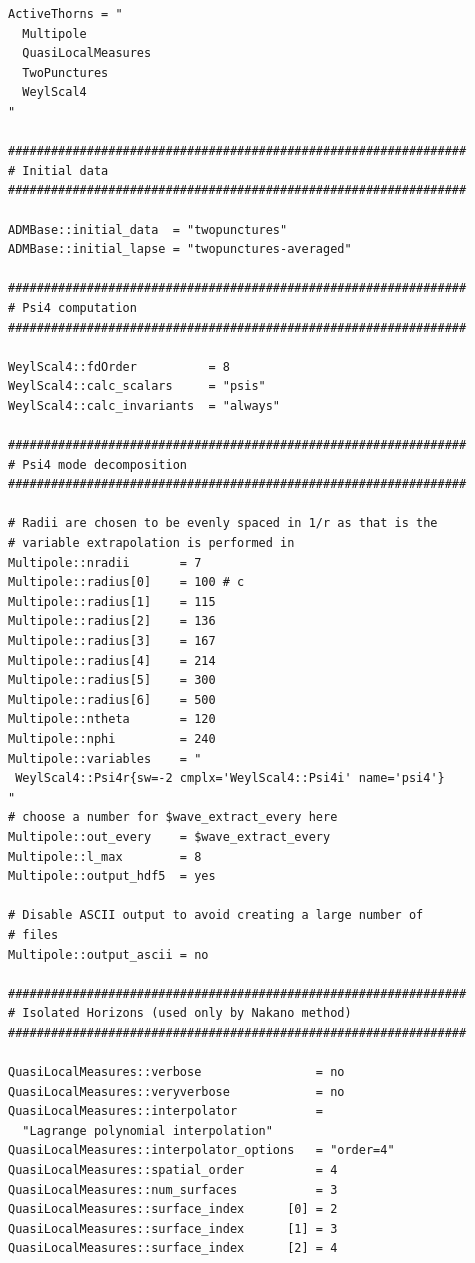 \begin{verbatim}
ActiveThorns = "
  Multipole
  QuasiLocalMeasures
  TwoPunctures
  WeylScal4
"

################################################################
# Initial data
################################################################

ADMBase::initial_data  = "twopunctures"
ADMBase::initial_lapse = "twopunctures-averaged"

################################################################
# Psi4 computation
################################################################

WeylScal4::fdOrder          = 8
WeylScal4::calc_scalars     = "psis"
WeylScal4::calc_invariants  = "always"

################################################################
# Psi4 mode decomposition
################################################################

# Radii are chosen to be evenly spaced in 1/r as that is the
# variable extrapolation is performed in
Multipole::nradii       = 7
Multipole::radius[0]    = 100 # c
Multipole::radius[1]    = 115
Multipole::radius[2]    = 136
Multipole::radius[3]    = 167
Multipole::radius[4]    = 214
Multipole::radius[5]    = 300
Multipole::radius[6]    = 500
Multipole::ntheta       = 120
Multipole::nphi         = 240
Multipole::variables    = "
 WeylScal4::Psi4r{sw=-2 cmplx='WeylScal4::Psi4i' name='psi4'}
"
# choose a number for $wave_extract_every here
Multipole::out_every    = $wave_extract_every
Multipole::l_max        = 8
Multipole::output_hdf5  = yes

# Disable ASCII output to avoid creating a large number of
# files
Multipole::output_ascii = no

################################################################
# Isolated Horizons (used only by Nakano method)
################################################################

QuasiLocalMeasures::verbose                = no
QuasiLocalMeasures::veryverbose            = no
QuasiLocalMeasures::interpolator           =
  "Lagrange polynomial interpolation"
QuasiLocalMeasures::interpolator_options   = "order=4"
QuasiLocalMeasures::spatial_order          = 4
QuasiLocalMeasures::num_surfaces           = 3
QuasiLocalMeasures::surface_index      [0] = 2
QuasiLocalMeasures::surface_index      [1] = 3
QuasiLocalMeasures::surface_index      [2] = 4

\end{verbatim}

